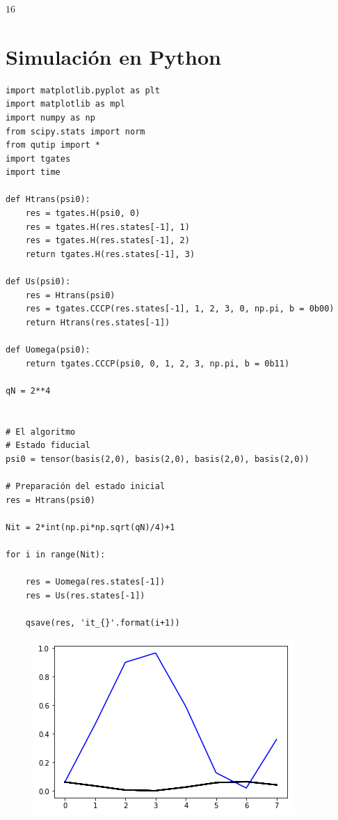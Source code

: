 \begin{doublespace}
\noindent\(16\)
\end{doublespace}


\section{Simulación en Python}

\begin{verbatim}
import matplotlib.pyplot as plt
import matplotlib as mpl
import numpy as np
from scipy.stats import norm
from qutip import *
import tgates
import time

def Htrans(psi0):
    res = tgates.H(psi0, 0)
    res = tgates.H(res.states[-1], 1)
    res = tgates.H(res.states[-1], 2)
    return tgates.H(res.states[-1], 3)

def Us(psi0):
    res = Htrans(psi0)
    res = tgates.CCCP(res.states[-1], 1, 2, 3, 0, np.pi, b = 0b00)
    return Htrans(res.states[-1])

def Uomega(psi0):
    return tgates.CCCP(psi0, 0, 1, 2, 3, np.pi, b = 0b11)

qN = 2**4


# El algoritmo
# Estado fiducial
psi0 = tensor(basis(2,0), basis(2,0), basis(2,0), basis(2,0))

# Preparación del estado inicial
res = Htrans(psi0)

Nit = 2*int(np.pi*np.sqrt(qN)/4)+1

for i in range(Nit):
    
    res = Uomega(res.states[-1])
    res = Us(res.states[-1])
    
    qsave(res, 'it_{}'.format(i+1))

\end{verbatim}

\begin{figure}[H]
\centering \includegraphics[width=0.9\linewidth]{img/groveralllossless.png}
\caption{}
\end{figure}

